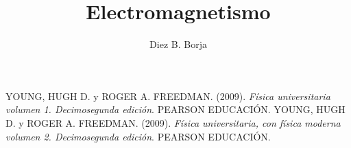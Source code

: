 \documentclass[letterpaper, onecolumn, 11pt]{report}
\begin{document}
\sffamily
\title{\Huge\textbf{{Electromagnetismo}}}
\author{Diez B. Borja}
\maketitle
\tableofcontents







%


\appendix


\newpage
\begin{thebibliography}{}
YOUNG, HUGH D. y ROGER A. FREEDMAN. (2009). \textit{Física universitaria volumen 1. Decimosegunda edición}. PEARSON EDUCACIÓN.
 YOUNG, HUGH D. y ROGER A. FREEDMAN. (2009). \textit{Física universitaria, con física moderna volumen 2.
Decimosegunda edición}. PEARSON EDUCACIÓN.

\end{thebibliography}
\end{document}
